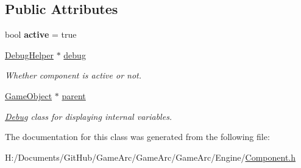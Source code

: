 \subsection*{Public Attributes}
\begin{DoxyCompactItemize}
\item 
\hypertarget{class_component_a2ebc869395d66425690dfeae99d1b791}{bool {\bfseries active} = true}\label{class_component_a2ebc869395d66425690dfeae99d1b791}

\item 
\hypertarget{class_component_a34ff24093894370eb2e25e0bc2833348}{\hyperlink{class_debug_helper}{Debug\+Helper} $\ast$ \hyperlink{class_component_a34ff24093894370eb2e25e0bc2833348}{debug}}\label{class_component_a34ff24093894370eb2e25e0bc2833348}

\begin{DoxyCompactList}\small\item\em Whether component is active or not. \end{DoxyCompactList}\item 
\hypertarget{class_component_a2b66804cabef14a2884c2d35f71a24ea}{\hyperlink{class_game_object}{Game\+Object} $\ast$ \hyperlink{class_component_a2b66804cabef14a2884c2d35f71a24ea}{parent}}\label{class_component_a2b66804cabef14a2884c2d35f71a24ea}

\begin{DoxyCompactList}\small\item\em \hyperlink{class_debug}{Debug} class for displaying internal variables. \end{DoxyCompactList}\end{DoxyCompactItemize}


The documentation for this class was generated from the following file\+:\begin{DoxyCompactItemize}
\item 
H\+:/\+Documents/\+Git\+Hub/\+Game\+Arc/\+Game\+Arc/\+Game\+Arc/\+Engine/\hyperlink{_component_8h}{Component.\+h}\end{DoxyCompactItemize}
